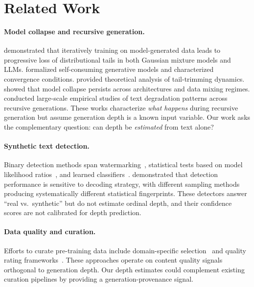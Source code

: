 \documentclass[11pt,a4paper]{article}
\begin{document}
\section{Related Work}

\paragraph{Model collapse and recursive generation.}
\citet{shumailov2024model} demonstrated that iteratively training on model-generated data leads to progressive loss of distributional tails in both Gaussian mixture models and LLMs. \citet{alemohammad2024selfconsuming} formalized self-consuming generative models and characterized convergence conditions. \citet{dohmatob2024tale} provided theoretical analysis of tail-trimming dynamics. \citet{gerstgrasser2024model} showed that model collapse persists across architectures and data mixing regimes. \citet{drayson2025emnlp} conducted large-scale empirical studies of text degradation patterns across recursive generations. These works characterize \emph{what happens} during recursive generation but assume generation depth is a known input variable. Our work asks the complementary question: can depth be \emph{estimated} from text alone?

\paragraph{Synthetic text detection.}
Binary detection methods span watermarking~\citep{kirchenbauer2023watermark}, statistical tests based on model likelihood ratios~\citep{hans2024binoculars,bao2024fastdetectgpt}, and learned classifiers~\citep{uchendu2020authorship}. \citet{garcesarias2025coling} demonstrated that detection performance is sensitive to decoding strategy, with different sampling methods producing systematically different statistical fingerprints. These detectors answer ``real vs.\ synthetic'' but do not estimate ordinal depth, and their confidence scores are not calibrated for depth prediction.

\paragraph{Data quality and curation.}
Efforts to curate pre-training data include domain-specific selection~\citep{xie2023dsir} and quality rating frameworks~\citep{wettig2024qurating}. These approaches operate on content quality signals orthogonal to generation depth. Our depth estimates could complement existing curation pipelines by providing a generation-provenance signal.
\end{document}
